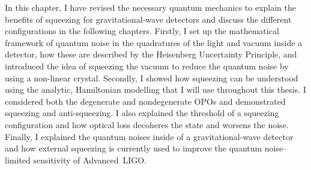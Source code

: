 In this chapter, I have revised the necessary quantum mechanics to explain the benefits of squeezing for gravitational-wave detectors and discuss the different configurations in the following chapters.
Firstly, I set up the mathematical framework of quantum noise in the quadratures of the light and vacuum inside a detector, how these are described by the Heisenberg Uncertainty Principle, and introduced the idea of squeezing the vacuum to reduce the quantum noise by using a non-linear crystal.  %
Secondly, I showed how squeezing can be understood using the analytic, Hamiltonian modelling that I will use throughout this thesis. I considered both the degenerate and nondegenerate OPOs and demonstrated squeezing and anti-squeezing. I also explained the threshold of a squeezing configuration and how optical loss decoheres the state and worsens the noise. %
Finally, I explained the quantum noises inside of a gravitational-wave detector and how external squeezing is currently used to improve the quantum noise--limited sensitivity of Advanced~LIGO. %


